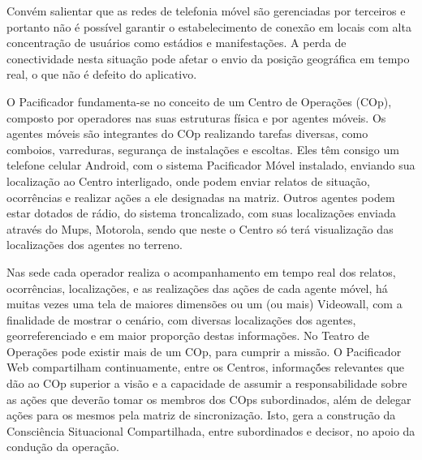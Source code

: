 
\hspace{1.5cm}
Convém salientar que as redes de telefonia móvel são gerenciadas por terceiros e portanto não é possível garantir o estabelecimento de conexão em locais com alta concentração de usuários como estádios e manifestações. A perda de conectividade nesta situação pode afetar o envio da posição geográfica em tempo real, o que não é defeito do aplicativo.

\hspace{1.5cm}
O Pacificador fundamenta-se no conceito de um Centro de Operações (COp), composto por operadores nas suas estruturas física e por agentes móveis. Os agentes móveis são integrantes do COp realizando tarefas diversas, como comboios, varreduras, segurança de instalações e escoltas. Eles têm consigo um telefone celular Android, com o sistema Pacificador Móvel instalado,  enviando sua localização ao Centro interligado, onde podem enviar relatos de situação, ocorrências e realizar ações a ele designadas na matriz. Outros agentes podem estar dotados de rádio, do sistema troncalizado, com suas localizações enviada através do Mups, Motorola, sendo que neste o Centro só terá visualização das localizações dos agentes no terreno.

\hspace{1.5cm}
Nas sede cada operador realiza o acompanhamento em tempo real dos relatos, ocorrências, localizações, e as realizações das ações de cada agente móvel, há muitas vezes uma tela de maiores dimensões ou um (ou mais) Videowall, com a finalidade de mostrar o cenário, com diversas localizações dos agentes, georreferenciado e em maior proporção destas informações. No Teatro de Operações pode existir mais de um COp, para cumprir a missão. O Pacificador Web compartilham continuamente, entre os Centros, informaçṍes relevantes que dão ao COp superior a visão e a capacidade de assumir a responsabilidade sobre as ações que deverão tomar os membros dos COps subordinados, além de delegar ações para os mesmos pela matriz de sincronização. Isto, gera a construção da Consciência Situacional Compartilhada, entre subordinados e decisor, no apoio da condução da operação.

